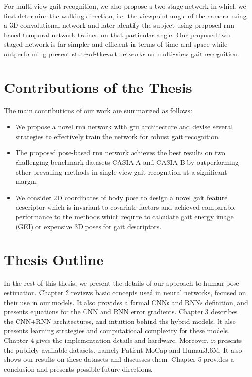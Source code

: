 For multi-view gait recognition, we also propose a two-stage network in which we first determine the walking direction, i.e. the viewpoint angle of the camera using a 3D convolutional network and later identify the subject using proposed \gls{rnn} based temporal network trained on that particular angle. Our proposed two-staged network is far simpler and efficient in terms of time and space while outperforming present state-of-the-art networks on multi-view gait recognition.


\section{Contributions of the Thesis}
The main contributions of our work are summarized as follows:
\begin{itemize}
\item We propose a novel \gls{rnn} network with \gls{gru} architecture and devise several strategies to effectively train the network for robust gait recognition. 

\item The proposed pose-based \gls{rnn} network achieves the best results on two challenging benchmark datasets CASIA A and CASIA B by outperforming other prevailing methods in single-view gait recognition at a significant margin.

\item We consider 2D coordinates of body pose to design a novel gait feature descriptor which is invariant to covariate factors and achieved comparable performance to the methods which require to calculate gait energy image (GEI) or expensive 3D poses for gait descriptors.
\end{itemize}


\section{Thesis Outline} 
In the rest of this thesis, we present the details of our approach to human pose estimation. Chapter 2 reviews basic concepts used in neural networks, focused on their use in our models. It also provides a formal CNNs and RNNs definition, and presents equations for the CNN and RNN error gradients. Chapter 3 describes the CNN+RNN architectures, and intuition behind the hybrid models. It also presents learning strategies and computational complexity for these models. Chapter 4 gives the implementation details and hardware. Moreover, it presents the publicly available datasets, namely Patient MoCap and Human3.6M. It also shows our results on these datasets and discusses them. Chapter 5 provides a conclusion and presents possible future directions.